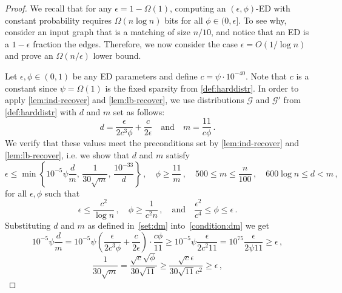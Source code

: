 \begin{proof}
	We recall that for any $\epsilon = 1-\Omega(1)$, computing an $(\epsilon,\phi)$-ED with constant probability requires $\Omega(n \log n)$ bits for all $\phi \in (0,\epsilon]$. To see why, consider an input graph that is a matching of size $n/10$, and notice that an ED is a $1-\epsilon$ fraction the edges. Therefore, we now consider the case $\epsilon =  O(1/\log n)$ and prove an $\Omega(n/\epsilon)$ lower bound.
	
	Let $\epsilon,\phi \in (0,1)$ be any ED parameters and define $c = \psi \cdot 10^{-40}$. Note that $c$ is a constant since $\psi = \Omega(1)$ is the fixed sparsity from \cref{def:harddistr}. In order to apply  \cref{lem:ind-recover} and \cref{lem:lb-recover}, we use distributions  $\mathcal{G}$ and $\mathcal{G}'$ from \cref{def:harddistr} with $d$ and $m$ set as follows:
	\begin{equation}
		\label{set:dm}
		d = \frac{\epsilon}{2c^3 \phi } + \frac{c}{2 \epsilon} \quad \text{and} \quad m = \frac{11}{c \phi} \, .
	\end{equation}
	We verify that these values meet the preconditions set by \cref{lem:ind-recover} and \cref{lem:lb-recover}, i.e. we show that $d$ and $m$ satisfy
	\begin{equation}
		\label{condition:dm}
		\epsilon \le \min \left\{10^{-5} \psi \frac{d}{m} , \, \frac{1}{30\sqrt{m}}, \, \frac{10^{-33}}{d}\right\}\, , \quad \phi \ge \frac{11}{m}\, , \quad 500 \le m \le \frac{n}{100}\, , \quad 600\log n \le d < m \, ,
	\end{equation}
	for all $\epsilon,\phi$ such that
	\begin{equation}
		\label{setting:epsphi}
		\epsilon \le \frac{c^2}{\log n} \, , \quad \phi \ge \frac{1}{c^2n} \, , \quad \text{and} \quad \frac{\epsilon^2}{c^4} \le \phi \le \epsilon \, .
	\end{equation}
	Substituting $d$ and $m$ as defined in~\eqref{set:dm} into~\eqref{condition:dm} we get
	\begin{equation*}
		10^{-5} \psi \frac{d}{m} = 10^{-5} \psi \left(\frac{\epsilon}{2c^3 \phi } + \frac{c}{2 \epsilon} \right) \cdot \frac{c\phi}{11} \ge 10^{-5} \psi \frac{\epsilon}{2c^2 11 } = 10^{75} \frac{\epsilon}{2\psi 11 } \ge \epsilon \, ,
	\end{equation*}
\begin{equation*}
	\frac{1}{30\sqrt{m}} = \frac{\sqrt{c}\sqrt{\phi}}{30\sqrt{11}} \ge \frac{\sqrt{c}\epsilon}{30\sqrt{11}c^2} \ge \epsilon\, ,
\end{equation*}

\end{proof}
